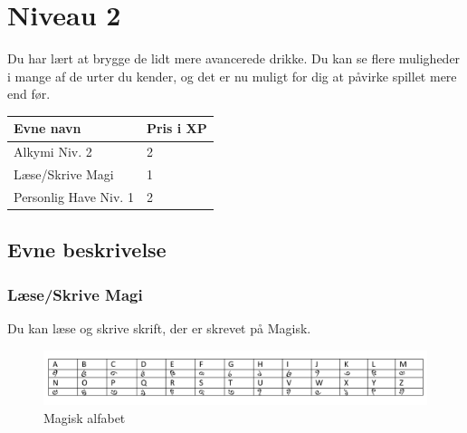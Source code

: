 \chapter*{Niveau 2}
Du har lært at brygge de lidt mere avancerede drikke. Du kan se flere muligheder i mange af de urter du kender, og det er nu muligt for dig at påvirke spillet mere end før.\\
\begin{table}[H]
    \centering
    \begin{tabular}{|p{}|p{}|}
    \rowcolor{cerulean!80}\hline
        Evne navn & Pris i XP \\\hline
         Alkymi Niv. 2 & 2 \\\hline
         Læse/Skrive Magi & 1 \\\hline
         Personlig Have Niv. 1 & 2 \\
         \hline
    \end{tabular}
\end{table}
\section*{Evne beskrivelse}



\subsection*{Læse/Skrive Magi}
Du kan læse og skrive skrift, der er skrevet på Magisk.\\
\begin{figure}[H]
    \centering
    \includegraphics[width=1\textwidth]{setup/Alfabeter/Magisk alfabet.pdf}
    \caption{Magisk alfabet}
\end{figure}

